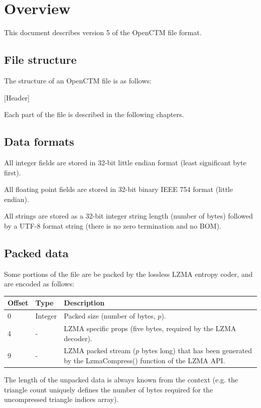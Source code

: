 \tableofcontents



\chapter{Overview}
This document describes version 5 of the OpenCTM file format.

\section{File structure}
The structure of an OpenCTM file is as follows:

[Header]

Each part of the file is described in the following chapters.

\section{Data formats}
All integer fields are stored in 32-bit little endian format (least significant
byte first).

All floating point fields are stored in 32-bit binary IEEE 754 format (little
endian).

All strings are stored as a 32-bit integer string length (number of bytes)
followed by a UTF-8 format string (there is no zero termination and no BOM).

\section{Packed data}
\label{sec:PackedData}
Some portions of the file are be packed by the lossless LZMA entropy coder,
and are encoded as follows:

\begin{tabular}{|l|l|p{11cm}|}\hline
\textbf{Offset} & \textbf{Type} & \textbf{Description}\\ \hline
0 & Integer & Packed size (number of bytes, $p$).\\ \hline
4 & - & LZMA specific props (five bytes, required by the LZMA decoder).\\ \hline
9 & - & LZMA packed stream ($p$ bytes long) that has been generated by the LzmaCompress() function of the LZMA API.\\ \hline
\end{tabular}

The length of the unpacked data is always known from the context (e.g. the
triangle count uniquely defines the number of bytes required for the
uncompressed triangle indices array).

